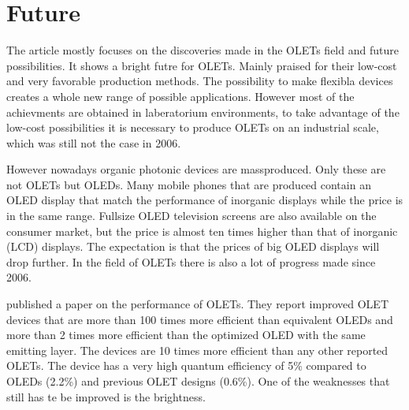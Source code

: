 \section{Future}\label{sec:future}
The article mostly focuses on the discoveries made in the OLETs field and future possibilities. It shows a bright futre for OLETs. Mainly praised for their low-cost and very favorable production methods. The possibility to make flexibla devices creates a whole new range of possible applications. However most of the achievments are obtained in laberatorium environments, to take advantage of the low-cost possibilities it is necessary to produce OLETs on an industrial scale, which was still not the case in 2006. 

However nowadays organic photonic devices are massproduced. Only these are not OLETs but OLEDs. Many mobile phones that are produced contain an OLED display that match the performance of inorganic displays while the price is in the same range. Fullsize OLED television screens are also available on the consumer market, but the price is almost ten times higher than that of inorganic (LCD) displays. The expectation is that the prices of big OLED displays will drop further. In the field of OLETs there is also a lot of progress made since 2006. 

\citet{Capelli} published a paper on the performance of OLETs. They report improved OLET devices that are more than 100 times more efficient than equivalent OLEDs and more than 2 times more efficient than the optimized OLED with the same emitting layer. The devices are 10 times more efficient than any other reported OLETs. The device has a very high quantum efficiency of 5\% compared to OLEDs (2.2\%) and previous OLET designs (0.6\%). One of the weaknesses that still has te be improved is the brightness.
